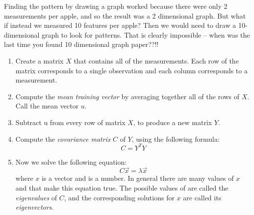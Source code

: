 Finding the pattern by drawing a graph worked because there were only 2 measurements per apple, and so the result was a 2 dimensional graph. But what if instead we measured 10 features per apple? Then we would need to draw a 10-dimensional graph to look for patterns. That is clearly impossible -- when was the last time you found 10 dimensional graph paper??!! \\

	\begin{enumerate}[1.]
	\item Create a matrix $X$ that contains all of the measurements. Each row of the matrix corresponds 	to a single observation and each column corresponds to a measurement.
	\item Compute the \emph{mean training vector} by averaging together all of the rows of $X$. Call the mean vector $u$.
	\item Subtract u from every row of matrix $X$, to produce a new matrix $Y$.
	\item Compute the \emph{covariance matrix} $C$ of $Y$, using the following formula:
		\[
		C=Y^T Y
		\]
	\item Now we solve the following equation:
		\[
		C \vec{x} = \lambda \vec{x}
		\]
	where $x$ is a vector and is a number. In general there are many values of $x$ and that make this equation true. The possible values of  are called the \emph{eigenvalues} of $C$, and the corresponding solutions for $x$ are called its \emph{eigenvectors}. \\
	\end{enumerate}

